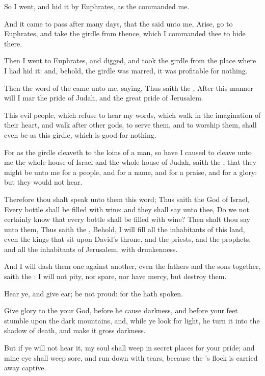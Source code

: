 \verse So I went, and hid it by Euphrates, as the \LORD commanded me.

\verse And it came to pass after many days, that the \LORD said unto me, Arise, go to Euphrates, and take the girdle from thence, which I commanded thee to hide there.

\verse Then I went to Euphrates, and digged, and took the girdle from the place where I had hid it: and, behold, the girdle was marred, it was profitable for nothing.

\verse Then the word of the \LORD came unto me, saying, \verse Thus saith the \LORD, After this manner will I mar the pride of Judah, and the great pride of Jerusalem.

\verse This evil people, which refuse to hear my words, which walk in the imagination of their heart, and walk after other gods, to serve them, and to worship them, shall even be as this girdle, which is good for nothing.

\verse For as the girdle cleaveth to the loins of a man, so have I caused to cleave unto me the whole house of Israel and the whole house of Judah, saith the \LORD; that they might be unto me for a people, and for a name, and for a praise, and for a glory: but they would not hear.

\verse Therefore thou shalt speak unto them this word; Thus saith the \LORD God of Israel, Every bottle shall be filled with wine: and they shall say unto thee, Do we not certainly know that every bottle shall be filled with wine?  \verse Then shalt thou say unto them, Thus saith the \LORD, Behold, I will fill all the inhabitants of this land, even the kings that sit upon David's throne, and the priests, and the prophets, and all the inhabitants of Jerusalem, with drunkenness.

\verse And I will dash them one against another, even the fathers and the sons together, saith the \LORD: I will not pity, nor spare, nor have mercy, but destroy them.

\verse Hear ye, and give ear; be not proud: for the \LORD hath spoken.

\verse Give glory to the \LORD your God, before he cause darkness, and before your feet stumble upon the dark mountains, and, while ye look for light, he turn it into the shadow of death, and make it gross darkness.

\verse But if ye will not hear it, my soul shall weep in secret places for your pride; and mine eye shall weep sore, and run down with tears, because the \LORD's flock is carried away captive.

